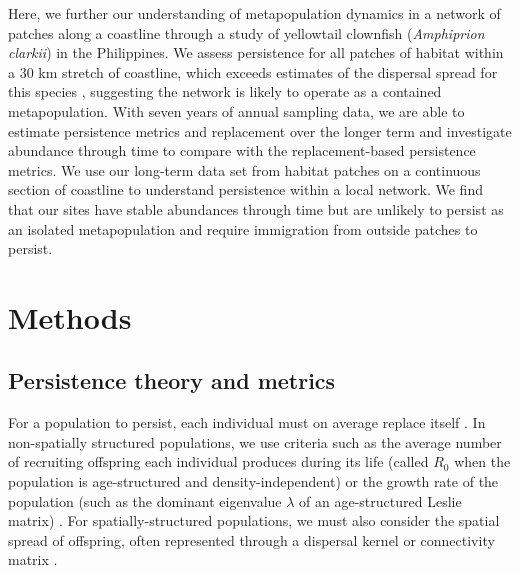 \documentclass[12pt, oneside]{article}   	%
\begin{document}
Here, we further our understanding of metapopulation dynamics in a network of patches along a coastline through a study of yellowtail clownfish (\textit{Amphiprion clarkii}) in the Philippines. We assess persistence for all patches of habitat within a 30 km stretch of coastline, which exceeds estimates of the dispersal spread for this species \citep{pinsky2010using}, suggesting the network is likely to operate as a contained metapopulation. With seven years of annual sampling data, we are able to estimate persistence metrics and replacement over the longer term and investigate abundance through time to compare with the replacement-based persistence metrics. We use our long-term data set from habitat patches on a continuous section of coastline to understand persistence within a local network. We find that our sites have stable abundances through time but are unlikely to persist as an isolated metapopulation and require immigration from outside patches to persist.%

\section*{Methods} 

\subsection*{Persistence theory and metrics}

For a population to persist, each individual must on average replace itself \citep[e.g.][]{hastings_persistence_2006, botsford2019population}. In non-spatially structured populations, we use criteria such as the average number of recruiting offspring each individual produces during its life (called $R_0$ when the population is age-structured and density-independent) or the growth rate of the population (such as the dominant eigenvalue $\lambda$ of an age-structured Leslie matrix) \citep{caswell_matrix_2001, burgess2014beyond}. For spatially-structured populations, we must also consider the spatial spread of offspring, often represented through a dispersal kernel or connectivity matrix \citep{burgess2014beyond}. %
\end{document}

